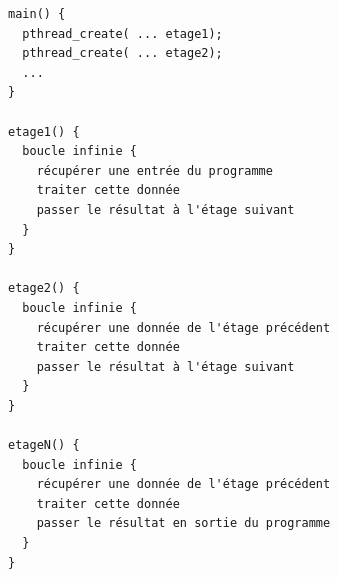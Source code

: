 \begin{lstlisting}
main() {
  pthread_create( ... etage1);
  pthread_create( ... etage2);
  ...
}

etage1() {
  boucle infinie {
    récupérer une entrée du programme
    traiter cette donnée
    passer le résultat à l'étage suivant
  }
}

etage2() {
  boucle infinie {
    récupérer une donnée de l'étage précédent
    traiter cette donnée
    passer le résultat à l'étage suivant
  }
}

etageN() {
  boucle infinie {
    récupérer une donnée de l'étage précédent
    traiter cette donnée
    passer le résultat en sortie du programme
  }
}
\end{lstlisting}
